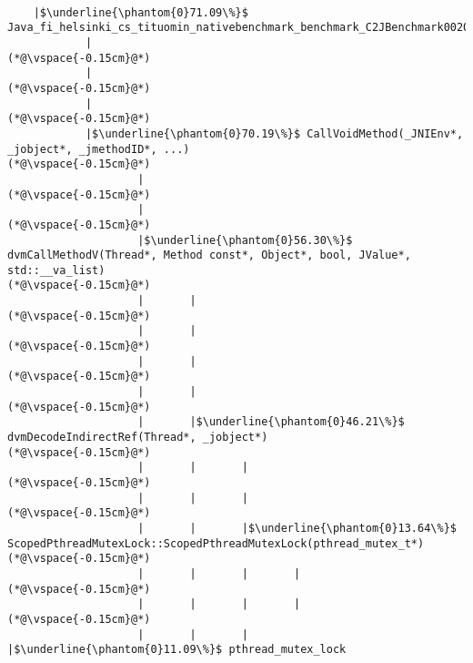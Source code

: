 
\begin{lstlisting}[caption=20 viiteparametria (C$\to$Java) , label=profile:C2JBenchmark00206, numberbychapter=true, frame=lines]

    |$\underline{\phantom{0}71.09\%}$ Java_fi_helsinki_cs_tituomin_nativebenchmark_benchmark_C2JBenchmark00206_runInternal
            |
(*@\vspace{-0.15cm}@*)
            |
(*@\vspace{-0.15cm}@*)
            |
(*@\vspace{-0.15cm}@*)
            |$\underline{\phantom{0}70.19\%}$ CallVoidMethod(_JNIEnv*, _jobject*, _jmethodID*, ...)
(*@\vspace{-0.15cm}@*)
                    |
(*@\vspace{-0.15cm}@*)
                    |
(*@\vspace{-0.15cm}@*)
                    |$\underline{\phantom{0}56.30\%}$ dvmCallMethodV(Thread*, Method const*, Object*, bool, JValue*, std::__va_list)
(*@\vspace{-0.15cm}@*)
                    |       |
(*@\vspace{-0.15cm}@*)
                    |       |
(*@\vspace{-0.15cm}@*)
                    |       |
(*@\vspace{-0.15cm}@*)
                    |       |
(*@\vspace{-0.15cm}@*)
                    |       |$\underline{\phantom{0}46.21\%}$ dvmDecodeIndirectRef(Thread*, _jobject*)
(*@\vspace{-0.15cm}@*)
                    |       |       |
(*@\vspace{-0.15cm}@*)
                    |       |       |
(*@\vspace{-0.15cm}@*)
                    |       |       |$\underline{\phantom{0}13.64\%}$ ScopedPthreadMutexLock::ScopedPthreadMutexLock(pthread_mutex_t*)
(*@\vspace{-0.15cm}@*)
                    |       |       |       |
(*@\vspace{-0.15cm}@*)
                    |       |       |       |
(*@\vspace{-0.15cm}@*)
                    |       |       |       |$\underline{\phantom{0}11.09\%}$ pthread_mutex_lock

\end{lstlisting}
